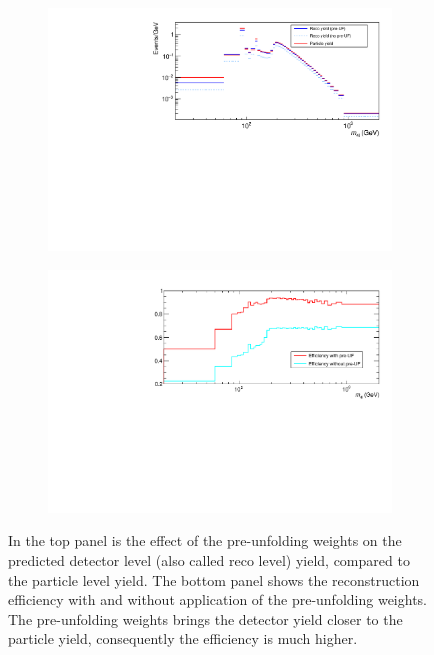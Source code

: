 \begin{figure}[htb]
    \begin{subfigure}{.85\textwidth}\centering
        \includegraphics[width=.99\textwidth]{Figures/m4l/UnfoldingStudies/v014_preUF_compare.pdf}\caption{}
    \end{subfigure}
        \begin{subfigure}{.79\textwidth}\centering
        \includegraphics[width=.99\textwidth]{Figures/m4l/UnfoldingStudies/efficiency_preUF.pdf}\caption{}
    \end{subfigure}
    \caption{In the top panel is the effect of the pre-unfolding weights on the predicted detector level (also called reco level) yield, compared to the particle level yield. The bottom panel shows the reconstruction efficiency with and without application of the pre-unfolding weights. The pre-unfolding weights brings the detector yield closer to the particle yield, consequently the efficiency is much higher.}
    \label{fig:preUF}
\end{figure}

